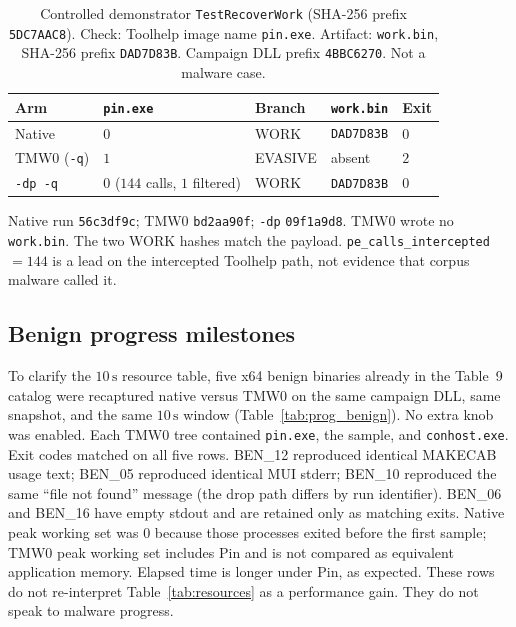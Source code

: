 \documentclass[pdflatex,sn-mathphys-num]{sn-jnl}
\theoremstyle{thmstyleone}
\theoremstyle{thmstyletwo}
\theoremstyle{thmstylethree}
\begin{document}
\begin{table}[t]
\caption{Controlled demonstrator \texttt{TestRecoverWork} (SHA-256 prefix \texttt{5DC7AAC8}). Check: Toolhelp image name \texttt{pin.exe}. Artifact: \texttt{work.bin}, SHA-256 prefix \texttt{DAD7D83B}. Campaign DLL prefix \texttt{4BBC6270}. Not a malware case.}
\label{tab:ctrl_pe}
\centering
\small
\begin{tabular}{lllll}
\toprule
\textbf{Arm} & \texttt{pin.exe} & \textbf{Branch} & \texttt{work.bin} & \textbf{Exit} \\
\midrule
Native & $0$ & WORK & \texttt{DAD7D83B} & $0$ \\
TMW0 (\texttt{-q}) & $1$ & EVASIVE & absent & $2$ \\
\texttt{-dp -q} & $0$ ($144$ calls, $1$ filtered) & WORK & \texttt{DAD7D83B} & $0$ \\
\bottomrule
\end{tabular}
\vspace{3pt}
\parbox{\columnwidth}{\footnotesize Native run \texttt{56c3df9c}; TMW0 \texttt{bd2aa90f}; \texttt{-dp} \texttt{09f1a9d8}. TMW0 wrote no \texttt{work.bin}. The two WORK hashes match the payload. \texttt{pe\_calls\_intercepted}$=144$ is a lead on the intercepted Toolhelp path, not evidence that corpus malware called it.}
\end{table}

\subsection{Benign progress milestones}
\label{subsec:prog_benign}

To clarify the $10\,\mathrm{s}$ resource table, five x64 benign binaries already in the Table~9 catalog were recaptured native versus TMW0 on the same campaign DLL, same snapshot, and the same $10\,\mathrm{s}$ window (Table~\ref{tab:prog_benign}). No extra knob was enabled. Each TMW0 tree contained \texttt{pin.exe}, the sample, and \texttt{conhost.exe}. Exit codes matched on all five rows. BEN\_12 reproduced identical MAKECAB usage text; BEN\_05 reproduced identical MUI stderr; BEN\_10 reproduced the same ``file not found'' message (the drop path differs by run identifier). BEN\_06 and BEN\_16 have empty stdout and are retained only as matching exits. Native peak working set was $0$ because those processes exited before the first sample; TMW0 peak working set includes Pin and is not compared as equivalent application memory. Elapsed time is longer under Pin, as expected. These rows do not re-interpret Table~\ref{tab:resources} as a performance gain. They do not speak to malware progress.
\end{document}
